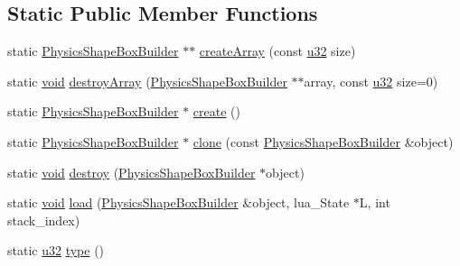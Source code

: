 \subsection*{Static Public Member Functions}
\begin{DoxyCompactItemize}
\item 
static \mbox{\hyperlink{classnjli_1_1_physics_shape_box_builder}{Physics\+Shape\+Box\+Builder}} $\ast$$\ast$ \mbox{\hyperlink{classnjli_1_1_physics_shape_box_builder_a4c31be2ff7f17fea5aad2dfc74f35e19}{create\+Array}} (const \mbox{\hyperlink{_util_8h_a10e94b422ef0c20dcdec20d31a1f5049}{u32}} size)
\item 
static \mbox{\hyperlink{_thread_8h_af1e856da2e658414cb2456cb6f7ebc66}{void}} \mbox{\hyperlink{classnjli_1_1_physics_shape_box_builder_a82c983d44cde0dc3a4bbe9213c2d41b4}{destroy\+Array}} (\mbox{\hyperlink{classnjli_1_1_physics_shape_box_builder}{Physics\+Shape\+Box\+Builder}} $\ast$$\ast$array, const \mbox{\hyperlink{_util_8h_a10e94b422ef0c20dcdec20d31a1f5049}{u32}} size=0)
\item 
static \mbox{\hyperlink{classnjli_1_1_physics_shape_box_builder}{Physics\+Shape\+Box\+Builder}} $\ast$ \mbox{\hyperlink{classnjli_1_1_physics_shape_box_builder_abebd1fabb504a63b33ee01edff45117e}{create}} ()
\item 
static \mbox{\hyperlink{classnjli_1_1_physics_shape_box_builder}{Physics\+Shape\+Box\+Builder}} $\ast$ \mbox{\hyperlink{classnjli_1_1_physics_shape_box_builder_a41cbe409e54e6c6411144e9a3507fd61}{clone}} (const \mbox{\hyperlink{classnjli_1_1_physics_shape_box_builder}{Physics\+Shape\+Box\+Builder}} \&object)
\item 
static \mbox{\hyperlink{_thread_8h_af1e856da2e658414cb2456cb6f7ebc66}{void}} \mbox{\hyperlink{classnjli_1_1_physics_shape_box_builder_ae6b9fe92a84c38262a12ae92d30a04c6}{destroy}} (\mbox{\hyperlink{classnjli_1_1_physics_shape_box_builder}{Physics\+Shape\+Box\+Builder}} $\ast$object)
\item 
static \mbox{\hyperlink{_thread_8h_af1e856da2e658414cb2456cb6f7ebc66}{void}} \mbox{\hyperlink{classnjli_1_1_physics_shape_box_builder_aabf5ec5ad49f44bef4a06d0a484010af}{load}} (\mbox{\hyperlink{classnjli_1_1_physics_shape_box_builder}{Physics\+Shape\+Box\+Builder}} \&object, lua\+\_\+\+State $\ast$L, int stack\+\_\+index)
\item 
static \mbox{\hyperlink{_util_8h_a10e94b422ef0c20dcdec20d31a1f5049}{u32}} \mbox{\hyperlink{classnjli_1_1_physics_shape_box_builder_afeb5a27c03c011899dc92d3925d14411}{type}} ()
\end{DoxyCompactItemize}
